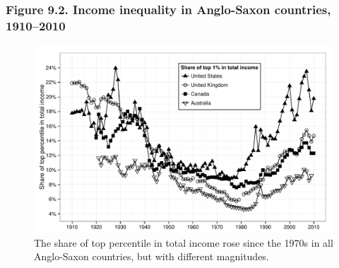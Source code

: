 \documentclass[t]{beamer}\usepackage[]{graphicx}\usepackage[]{color}
\newenvironment{knitrout}{}{} %
\begin{document}
\begin{frame}[label=Figure_9_2]
\frametitle{Figure 9.2. Income inequality in Anglo-Saxon countries, 1910--2010}
\begin{figure}[t]
\begin{minipage}[b]{\textwidth}
\centering
\begin{knitrout}\footnotesize
{}\color{fgcolor}

{\centering \includegraphics[width=1\linewidth]{figures/bw/Figure_9_2} 

}



\end{knitrout}
\caption{The share of top percentile in total income rose since the 1970s in all Anglo-Saxon countries, but with different magnitudes.}
\end{minipage}
\end{figure}
\end{frame}
\end{document}
